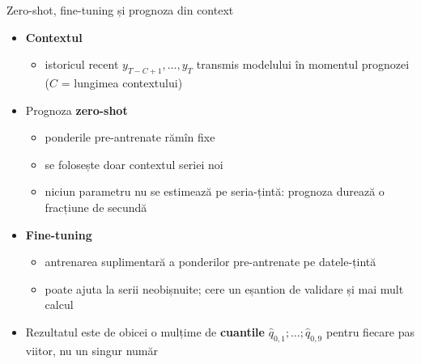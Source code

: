 \begin{frame}{Zero-shot, fine-tuning și prognoza din context}
\itemsize{\small}
\begin{itemize}
    \item \textbf{Contextul}
    \begin{itemize}
        \item istoricul recent $y_{T-C+1}, \dots, y_T$ transmis modelului în momentul prognozei ($C$ = lungimea contextului)
    \end{itemize}
    \item Prognoza \textbf{zero-shot}
    \begin{itemize}
        \item ponderile pre-antrenate rămîn fixe
        \item se folosește doar contextul seriei noi
        \item niciun parametru nu se estimează pe seria-țintă: prognoza durează o fracțiune de secundă
    \end{itemize}
    \item \textbf{Fine-tuning}
    \begin{itemize}
        \item antrenarea suplimentară a ponderilor pre-antrenate pe datele-țintă
        \item poate ajuta la serii neobișnuite; cere un eșantion de validare și mai mult calcul
    \end{itemize}
    \item Rezultatul este de obicei o mulțime de \textbf{cuantile} $\hat q_{0{,}1}; \dots; \hat q_{0{,}9}$ pentru fiecare pas viitor, nu un singur număr
\end{itemize}
\end{frame}

